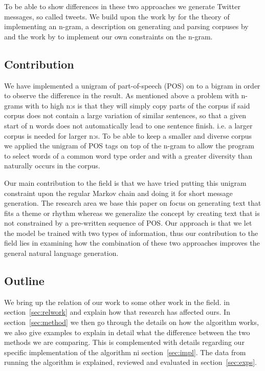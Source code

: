\documentclass[a4paper,12pt]{article}
\begin{document}
To be able to show differences in these two approaches we generate Twitter messages, so called tweets. 
We build upon the work by \cite{shannon48} for the theory of implementing an n-gram, a description on generating and parsing corpuses by \citep{Corpus}
and the work by \citealp{McBarb} to implement our own constraints on the n-gram.
   
\subsection{Contribution}

We have implemented a unigram of part-of-speech (POS) on to a bigram in order to observe the difference in the result. 
As mentioned above a problem with n-grams with to high n:s is that they will simply copy parts of the corpus if said corpus does not contain a large variation of similar sentences, 
so that a given start of n words does not automatically lead to one sentence finish. i.e. a larger corpus is needed for larger n:s.
To be able to keep a smaller and diverse corpus we applied the unigram of POS tags on top of the n-gram to allow the program to select words of a common word type order and with a greater diversity than naturally occurs in the corpus.

Our main contribution to the field is that we have tried putting this unigram constraint upon the regular Markov chain and doing it for short message generation.
The research area we base this paper on focus on generating text that fits a theme or rhythm whereas we generalize the concept by creating text that is not constrained by a pre-written sequence of POS. 
Our approach is that we let the model be trained with two types of information, thus our contribution to the field lies in examining how the combination of these two approaches improves the general natural language generation.



\subsection{Outline}
We bring up the relation of our work to some other work in the field. \cite{McBarb} in section~\ref{sec:relwork} and explain how that research has affected ours. 
In section~\ref{sec:method} we then go through the details on how the algorithm works, 
we also give examples to explain in detail what the difference between the two methods we are comparing. This is complemented with details regarding our specific
implementation of the algorithm ni section~\ref{sec:impl}. The data from running the algorithm is explained, reviewed and evaluated in section~\ref{sec:exps}.
\end{document}
